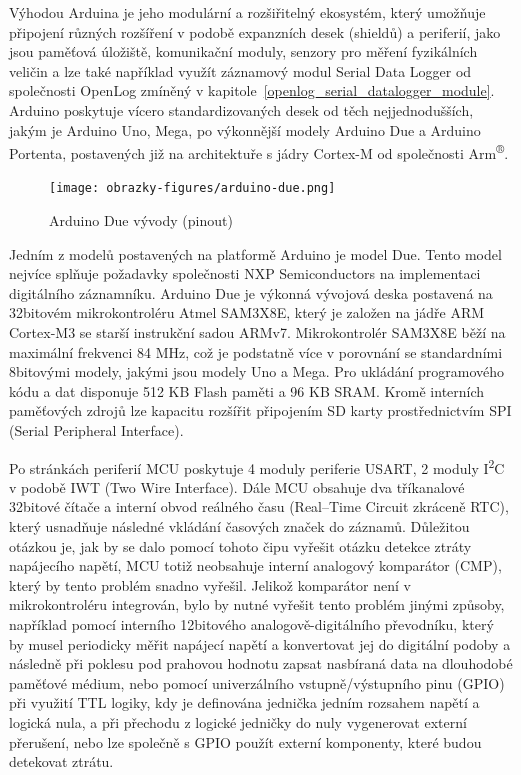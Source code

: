 Výhodou Arduina je jeho modulární a rozšiřitelný ekosystém, který umožňuje připojení různých rozšíření v podobě expanzních desek (shieldů) a periferií, jako jsou paměťová úložiště, komunikační moduly, senzory pro měření fyzikálních veličin a lze také například využít záznamový modul Serial Data Logger od společnosti OpenLog zmíněný v kapitole~\ref{openlog_serial_datalogger_module}. Arduino poskytuje vícero standardizovaných desek od těch nejjednodušších, jakým je Arduino Uno, Mega, po výkonnější modely Arduino Due a Arduino Portenta, postavených již na architektuře s jádry Cortex-M od společnosti Arm\textsuperscript{®}.

\begin{figure}[h]
    \centering
    \texttt{[image: obrazky-figures/arduino-due.png]}
    
    \caption{Arduino Due vývody (pinout) \cite{arduino_shop_due}}
    \label{fig:arduino-due-pinout}
\end{figure}


Jedním z modelů postavených na platformě Arduino je model Due. Tento model nejvíce splňuje požadavky společnosti NXP Semiconductors na implementaci digitálního záznamníku. Arduino Due je výkonná vývojová deska postavená na 32bitovém mikrokontroléru Atmel SAM3X8E, který je založen na jádře ARM Cortex-M3 se starší instrukční sadou ARMv7. Mikrokontrolér SAM3X8E běží na maximální frekvenci 84 MHz, což je podstatně více v porovnání se standardními 8bitovými modely, jakými jsou modely Uno a Mega. Pro ukládání programového kódu a dat disponuje 512 KB Flash paměti a 96 KB SRAM. Kromě interních paměťových zdrojů lze kapacitu rozšířit připojením SD karty prostřednictvím SPI (Serial Peripheral Interface). \cite{arduino_shop_due, arduino_shop_due}

Po stránkách periferií MCU poskytuje 4 moduly periferie USART, 2 moduly I\textsuperscript{2}C v podobě IWT (Two Wire Interface). Dále MCU obsahuje dva tříkanalové 32bitové čítače a interní obvod reálného času (Real--Time Circuit zkráceně RTC), který usnadňuje následné vkládání časových značek do záznamů. Důležitou otázkou je, jak by se dalo pomocí tohoto čipu vyřešit otázku detekce ztráty napájecího napětí, MCU totiž neobsahuje interní analogový komparátor (CMP), který by tento problém snadno vyřešil. Jelikož komparátor není v mikrokontroléru integrován, bylo by nutné vyřešit tento problém jinými způsoby, například pomocí interního 12bitového analogově-digitálního převodníku, který by musel periodicky měřit napájecí napětí a konvertovat jej do digitální podoby a následně při poklesu pod prahovou hodnotu zapsat nasbíraná data na dlouhodobé paměťové médium, nebo pomocí univerzálního vstupně/výstupního pinu (GPIO) při využití TTL logiky, kdy je definována jednička jedním rozsahem napětí a logická nula, a při přechodu z logické jedničky do nuly vygenerovat externí přerušení, nebo lze společně s GPIO použít externí komponenty, které budou detekovat ztrátu. \cite{arduino_shop_due}

